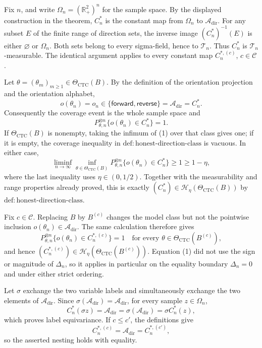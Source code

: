 Fix \(n\), and write \(\Omega_n=(\mathbb R_+^2)^n\) for the sample space.  By the displayed construction in the theorem, \(C_n^*\) is the constant map from \(\Omega_n\) to \(\mathcal A_{\mathrm{dir}}\).  For any subset \(E\) of the finite range of direction sets, the inverse image \((C_n^*)^{-1}(E)\) is either \(\varnothing\) or \(\Omega_n\).  Both sets belong to every sigma-field, hence to \(\mathcal T_n\).  Thus \(C_n^*\) is \(\mathcal T_n\)-measurable.  The identical argument applies to every constant map \(C_n^{*,(c)}\), \(c\in\mathcal C\).

Let \(\theta=(\theta_m)_{m\geq1}\in\Theta_{\mathrm{CTC}}(B)\).  By the definition of the orientation projection and the orientation alphabet,
\[
 o(\theta_n)=o_n\in\{\mathsf{forward},\mathsf{reverse}\}
 =\mathcal A_{\mathrm{dir}}=C_n^*.
\]
Consequently the coverage event is the whole sample space and
\[
 P_{\theta,n}^{\otimes n}\{o(\theta_n)\in C_n^*\}=1. \tag{1}
\]
If \(\Theta_{\mathrm{CTC}}(B)\) is nonempty, taking the infimum of (1) over that class gives one; if it is empty, the coverage inequality in \(\mathrm{def{:}honest\text{-}direction\text{-}class}\) is vacuous.  In either case,
\[
 \liminf_{n\to\infty}\inf_{\theta\in\Theta_{\mathrm{CTC}}(B)}
 P_{\theta,n}^{\otimes n}\{o(\theta_n)\in C_n^*\}
 \geq 1\geq 1-\eta,
\]
where the last inequality uses \(\eta\in(0,1/2)\).  Together with the measurability and range properties already proved, this is exactly
\((C_n^*)\in\mathcal H_\eta(\Theta_{\mathrm{CTC}}(B))\) by \(\mathrm{def{:}honest\text{-}direction\text{-}class}\).

Fix \(c\in\mathcal C\).  Replacing \(B\) by \(B^{(c)}\) changes the model class but not the pointwise inclusion \(o(\theta_n)\in\mathcal A_{\mathrm{dir}}\).  The same calculation therefore gives
\[
 P_{\theta,n}^{\otimes n}\{o(\theta_n)\in C_n^{*,(c)}\}=1
 \quad\text{for every }\theta\in\Theta_{\mathrm{CTC}}(B^{(c)}),
\]
and hence \((C_n^{*,(c)})\in\mathcal H_\eta(\Theta_{\mathrm{CTC}}(B^{(c)}))\).  Equation (1) did not use the sign or magnitude of \(\Delta_n\), so it applies in particular on the equality boundary \(\Delta_n=0\) and under either strict ordering.

Let \(\sigma\) exchange the two variable labels and simultaneously exchange the two elements of \(\mathcal A_{\mathrm{dir}}\).  Since \(\sigma(\mathcal A_{\mathrm{dir}})=\mathcal A_{\mathrm{dir}}\), for every sample \(z\in\Omega_n\),
\[
 C_n^*(\sigma z)=\mathcal A_{\mathrm{dir}}
 =\sigma(\mathcal A_{\mathrm{dir}})=\sigma C_n^*(z),
\]
which proves label equivariance.  If \(c\leq c'\), the definitions give
\[
 C_n^{*,(c)}=\mathcal A_{\mathrm{dir}}=C_n^{*,(c')},
\]
so the asserted nesting holds with equality.


